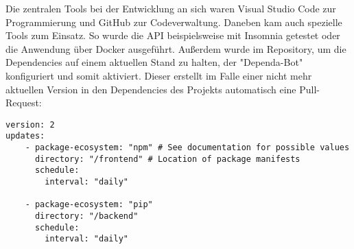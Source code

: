 Die zentralen Tools bei der Entwicklung an sich waren Visual Studio Code zur Programmierung und GitHub zur Codeverwaltung. Daneben kam auch spezielle Tools zum Einsatz. So wurde die API beispielsweise mit Insomnia getestet oder die Anwendung über Docker ausgeführt. Außerdem wurde im Repository, um die  Dependencies auf einem aktuellen Stand zu halten, der "Dependa-Bot" konfiguriert und somit aktiviert. Dieser erstellt im Falle einer nicht mehr aktuellen Version in den Dependencies des Projekts automatisch eine Pull-Request:

\begin{lstlisting}
version: 2
updates:
	- package-ecosystem: "npm" # See documentation for possible values
	  directory: "/frontend" # Location of package manifests
	  schedule:
		interval: "daily"
	
	- package-ecosystem: "pip"
	  directory: "/backend"
	  schedule:
		interval: "daily"
\end{lstlisting}

